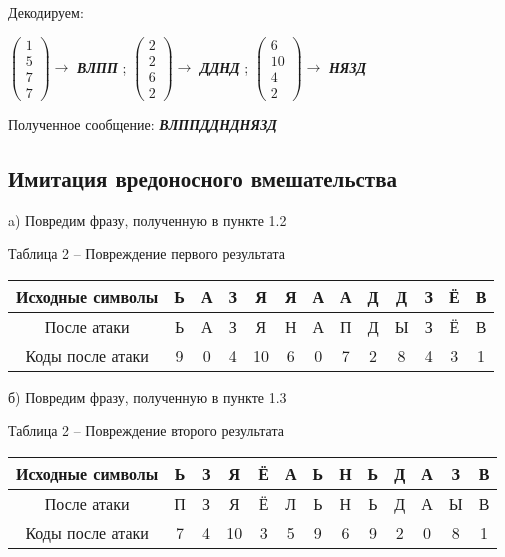 \documentclass[a5paper, 10pt]{article}
\theoremstyle{definition}
\theoremstyle{plain}
\theoremstyle{remark}
\begin{document}
Декодируем:
\begin{center}
 $ \begin{pmatrix}
 1\\
5\\
7\\
7
\end{pmatrix} \to$ \textbf{\textit{ВЛПП}} ;
 $ \begin{pmatrix}
 2\\
2 \\
6\\
2
\end{pmatrix} \to$ \textbf{\textit{ДДНД}} ;
 $ \begin{pmatrix}
 6\\
10\\
4\\
2
\end{pmatrix} \to$ \textbf{\textit{НЯЗД}} 
 \\

\end{center}
Полученное сообщение:  \textbf{\textit{ВЛППДДНДНЯЗД}}

\subsection{Имитация вредоносного вмешательства}
 a) Повредим фразу, полученную в пункте 1.2
\begin{center}
Таблица 2 -- Повреждение первого результата\\
\begin{tabular}{ |c|c|c|c|c|c|c|c|c|c|c|c|c| } 
 \hline
Исходные символы & Ь & А & З & Я & Я  & А & А  & Д & Д  & З & Ё  & В\\
\hline
После атаки & Ь & А & З & Я & Н  & А & П  & Д & Ы  & З & Ё  & В \\
 \hline
Коды после атаки & 9 & 0 & 4 & 10 & 6  & 0 & 7  & 2 & 8  & 4 & 3  & 1  \\
 \hline
\end{tabular}
\end{center}


 б) Повредим фразу, полученную в пункте 1.3
\begin{center}
Таблица 2 -- Повреждение  второго результата\\
\begin{tabular}{ |c|c|c|c|c|c|c|c|c|c|c|c|c| } 
 \hline
Исходные символы & Ь & З & Я & Ё & А  & Ь & Н  & Ь & Д  & А & З  & В\\
\hline
После атаки & П & З & Я & Ё & Л  & Ь & Н  & Ь & Д  & А & Ы  & В \\
 \hline
Коды после атаки & 7 & 4 & 10 & 3 & 5  & 9 & 6  & 9 & 2  & 0 & 8  & 1  \\
 \hline
\end{tabular}
\end{center}
\end{document}

